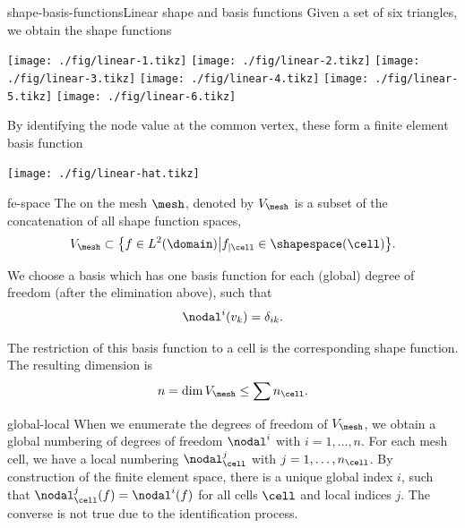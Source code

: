 \begin{Example*}{shape-basis-functions}{Linear shape and basis functions}
  Given a set of six triangles, we obtain the shape functions
  \begin{center}
    \texttt{[image: ./fig/linear-1.tikz]}
    \texttt{[image: ./fig/linear-2.tikz]}
    \texttt{[image: ./fig/linear-3.tikz]}
    \texttt{[image: ./fig/linear-4.tikz]}
    \texttt{[image: ./fig/linear-5.tikz]}
    \texttt{[image: ./fig/linear-6.tikz]}
  \end{center}
  By identifying the node value at the common vertex, these form a finite element basis function
  \begin{center}
    \texttt{[image: ./fig/linear-hat.tikz]}    
  \end{center}
\end{Example*}

\begin{Definition}{fe-space}
  The  on the mesh $\mesh$, denoted by
  $V_\mesh$ is a subset of the concatenation of all shape function
  spaces,
  \begin{gather}
    V_\mesh \subset \bigl\{ f\in L^2(\domain) \big|
    f_{|\cell} \in \shapespace(\cell) \bigr\}.
  \end{gather}
  
  We choose a basis which has one basis function for each (global)
  degree of freedom (after the elimination above), such that
  \begin{gather}
    \nodal^i(v_k) = \delta_{ik}.
  \end{gather}

  The restriction of this basis function to a cell is the
  corresponding shape function.  The resulting dimension is
  \begin{gather}
    n = \dim V_\mesh \le \sum n_\cell.
  \end{gather}
\end{Definition}

\begin{Notation}{global-local}
  When we enumerate the degrees of freedom of $V_\mesh$, we obtain a
  global numbering of degrees of freedom $\nodal^i$ with
  $i=1,\dots,n$. For each mesh cell, we have a local numbering
  $\nodal_\cell^j$ with $j=1,\dots,n_{\cell}$. By construction of the finite
  element space, there is a unique global index $i$, such that
  $\nodal_\cell^j(f) = \nodal^i(f)$ for all cells $\cell$ and local
  indices $j$. The converse is not true due to the identification
  process.
\end{Notation}

